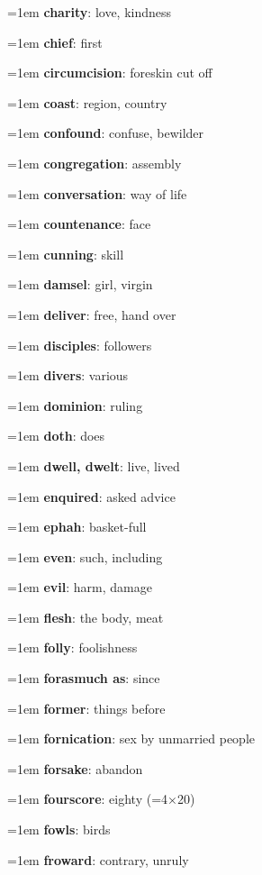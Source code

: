 {\begin{multicols}{3}
{\hangindent=1em \textbf{charity}: love, kindness\par
\hangindent=1em \textbf{chief}: first\par
\hangindent=1em \textbf{circumcision}: foreskin cut off\par
\hangindent=1em \textbf{coast}: region, country\par
\hangindent=1em \textbf{confound}: confuse, bewilder\par
\hangindent=1em \textbf{congregation}: assembly\par
\hangindent=1em \textbf{conversation}: way of life\par
\hangindent=1em \textbf{countenance}: face\par
\hangindent=1em \textbf{cunning}: skill\par
\hangindent=1em \textbf{damsel}: girl, virgin\par
\hangindent=1em \textbf{deliver}: free, hand over\par
\hangindent=1em \textbf{disciples}: followers\par
\hangindent=1em \textbf{divers}: various\par
\hangindent=1em \textbf{dominion}: ruling\par
\hangindent=1em \textbf{doth}: does\par
\hangindent=1em \textbf{dwell, dwelt}: live, lived\par
\hangindent=1em \textbf{enquired}: asked advice\par
\hangindent=1em \textbf{ephah}: basket-full\par
\hangindent=1em \textbf{even}: such, including\par
\hangindent=1em \textbf{evil}: harm, damage\par
\hangindent=1em \textbf{flesh}: the body, meat\par
\hangindent=1em \textbf{folly}: foolishness\par
\hangindent=1em \textbf{forasmuch as}: since\par
\hangindent=1em \textbf{former}: things before\par
\hangindent=1em \textbf{fornication}: sex by unmarried people\par
\hangindent=1em \textbf{forsake}: abandon\par
\hangindent=1em \textbf{fourscore}: eighty (=4$\times$20)\par
\hangindent=1em \textbf{fowls}: birds\par
\hangindent=1em \textbf{froward}: contrary, unruly\par
}
\end{multicols}}
